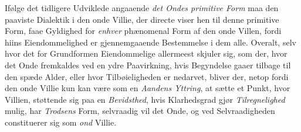 Ifølge det tidligere Udviklede angaaende \emph{det Ondes primitive Form} maa den
paaviste Dialektik i den onde Villie, der directe viser hen til denne primitive
Form, faae Gyldighed for \emph{enhver} phænomenal Form af den onde
 Villen, fordi hiins Eiendommelighed er gjennemgaaende Bestemmelse i dem alle.
Overalt, selv hvor det for Grundformen Eiendommelige allermeest skjuler sig, som
der, hvor det Onde fremkaldes ved en ydre Paavirkning, hvis Begyndelse gaaer
tilbage til den spæde Alder, eller hvor Tilbøieligheden er nedarvet, bliver der,
netop fordi den onde Villie kun kan være som en \emph{Aandens Yttring}, at sætte
et Punkt, hvor Villien, støttende sig paa en \emph{Bevidsthed}, hvis Klarhedsgrad
gjør \emph{Tilregnelighed} mulig, har \emph{Trodsens} Form, selvraadig vil det
Onde, og ved Selvraadigheden constituerer sig som \emph{ond} Villie.

